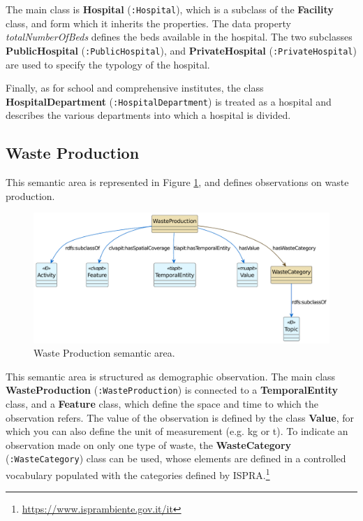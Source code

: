 The main class is \textbf{Hospital} (\verb#:Hospital#), which is a subclass of the \textbf{Facility} class, and form which it inherits the properties. The data property \textit{totalNumberOfBeds} defines the beds available in the hospital. The two subclasses \textbf{PublicHospital} (\verb#:PublicHospital#), and \textbf{PrivateHospital} (\verb#:PrivateHospital#) are used to specify the typology of the hospital.

Finally, as for school and comprehensive institutes, the class \textbf{HospitalDepartment} (\verb#:HospitalDepartment#) is treated as a hospital and describes the various departments into which a hospital is divided.

\subsection{Waste Production}
\label{subsec:waste-production}

This semantic area is represented in Figure \ref{fig:waste-sa}, and defines observations on waste production.

\begin{figure}[!ht]
  \centering
  \includegraphics[width=\columnwidth]{images/ontoim/waste}
  \caption{Waste Production semantic area.}
  \label{fig:waste-sa}
\end{figure}

This semantic area is structured as demographic observation. The main class \textbf{WasteProduction} (\verb#:WasteProduction#) is connected to a \textbf{TemporalEntity} class, and a \textbf{Feature} class, which define the space and time to which the observation refers. The value of the observation is defined by the class \textbf{Value}, for which you can also define the unit of measurement (e.g. kg or t). To indicate an observation made on only one type of waste, the \textbf{WasteCategory} (\verb#:WasteCategory#) class can be used, whose elements are defined in a controlled vocabulary populated with the categories defined by ISPRA.\footnote{\url{https://www.isprambiente.gov.it/it}}